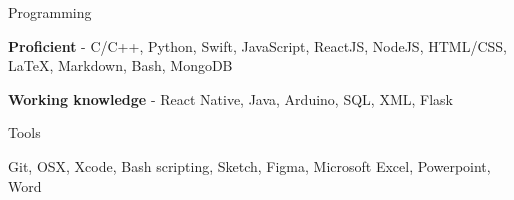 \vspace{-1mm}
\vspace{3mm}
	\cventry
	{}
	{Programming}
	{}
	{}
	{\begin{cvitems}
		\vspace{-5mm}
		\item {\textbf{Proficient} - C/C++, Python, Swift, JavaScript, ReactJS, NodeJS, HTML/CSS, LaTeX, Markdown, Bash, MongoDB}
		\item {\textbf{Working knowledge} - React Native, Java, Arduino, SQL, XML, Flask}
		\end{cvitems}}

	\vspace{-2mm}
	\cventry
	{}
	{Tools}
	{}
	{}
	{\begin{cvitems}
		\vspace{-7mm}
		\item { Git, OSX, Xcode, Bash scripting, Sketch, Figma, Microsoft Excel, Powerpoint, Word }
		\end{cvitems}}
	\vspace{-4mm}
